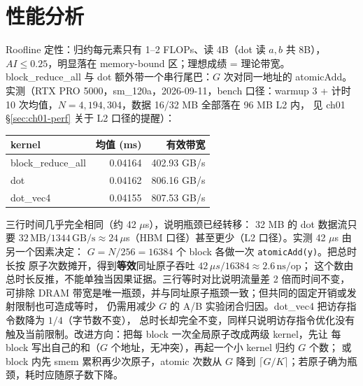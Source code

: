 \section{性能分析}\label{sec:ch02-perf}

Roofline 定性：归约每元素只有 1--2 FLOPs、读 4B（dot 读 $a,b$
共 8B），$AI \le 0.25$，明显落在 memory-bound 区；理想成绩 = 理论带宽。
block\_reduce\_all 与 dot 额外带一个串行尾巴：$G$ 次对同一地址的
atomicAdd。实测（RTX PRO 5000，sm\_120a，2026-09-11，bench 口径：warmup 3
+ 计时 10 次均值，$N = 4{,}194{,}304$，数据 16/32 MB 全部落在 96 MB L2 内，
见 ch01 \S\ref{sec:ch01-perf} 关于 L2 口径的提醒）：

\begin{center}
\begin{tabular}{lrr}
\toprule
kernel & 均值 (ms) & 有效带宽 \\
\midrule
block\_reduce\_all & 0.04164 & 402.93 GB/s \\
dot & 0.04162 & 806.16 GB/s \\
dot\_vec4 & 0.04155 & 807.53 GB/s \\
\bottomrule
\end{tabular}
\end{center}

三行时间几乎完全相同（约 42 $\mu$s），说明瓶颈已经转移：
32 MB 的 dot 数据流只要 $32\,\mathrm{MB} / 1344\,\mathrm{GB/s} \approx
24\,\mu$s（HBM 口径）甚至更少（L2 口径）。实测 42 $\mu$s 由另一个因素决定：
$G = N/256 = 16384$ 个 block 各做一次 \texttt{atomic\allowbreak{}Add\allowbreak{}(y)}。把总时长按
原子次数摊开，得到\textbf{等效}同址原子吞吐 $42\,\mu s / 16384 \approx 2.6\,\mathrm{ns/op}$；
这个数由总时长反推，不能单独当因果证据。三行等时对比说明流量差 2 倍而时间不变，
可排除 DRAM 带宽是唯一瓶颈，并与同址原子瓶颈一致；但共同的固定开销或发射限制也可造成等时，
仍需用减少 $G$ 的 A/B 实验闭合归因。dot\_vec4 把访存指令数降为 $1/4$（字节数不变），
总时长却完全不变，同样只说明访存指令优化没有触及当前限制。改进方向：把每 block 一次全局原子改成两级 kernel，先让
每 block 写出自己的和（$G$ 个地址，无冲突），再起一个小 kernel 归约 $G$ 个数；
或 block 内先 smem 累积再少次原子，atomic 次数从 $G$ 降到
$\lceil G/K \rceil$；若原子确为瓶颈，耗时应随原子数下降。

